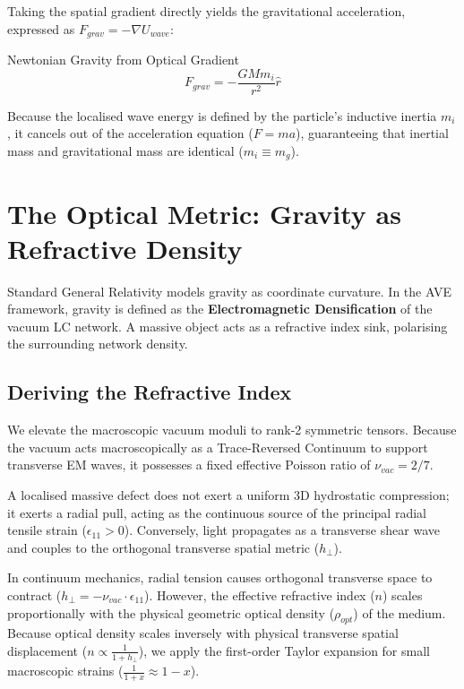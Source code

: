 Taking the spatial gradient directly yields the gravitational acceleration, expressed as $F_{grav}=-\nabla U_{wave}$:

\begin{resultbox}{Newtonian Gravity from Optical Gradient}
\begin{equation}
F_{grav}=-\frac{GM m_i}{r^{2}}\hat{r}
\end{equation}
\end{resultbox}

Because the localised wave energy is defined by the particle's inductive inertia $m_i$, it cancels out of the acceleration equation ($F=ma$), guaranteeing that inertial mass and gravitational mass are identical ($m_i\equiv m_g$).

\section{The Optical Metric: Gravity as Refractive Density}
\label{sec:optical_metric}

Standard General Relativity models gravity as coordinate curvature. In the AVE framework, gravity is defined as the \textbf{Electromagnetic Densification} of the vacuum LC network. A massive object acts as a refractive index sink, polarising the surrounding network density.

\subsection{Deriving the Refractive Index}

We elevate the macroscopic vacuum moduli to rank-2 symmetric tensors. Because the vacuum acts macroscopically as a Trace-Reversed Continuum to support transverse EM waves, it possesses a fixed effective Poisson ratio of $\nu_{vac}=2/7$. 

A localised massive defect does not exert a uniform 3D hydrostatic compression; it exerts a radial pull, acting as the continuous source of the principal radial tensile strain ($\epsilon_{11} > 0$). Conversely, light propagates as a transverse shear wave and couples to the orthogonal transverse spatial metric ($h_{\perp}$). 

In continuum mechanics, radial tension causes orthogonal transverse space to contract ($h_{\perp} = -\nu_{vac} \cdot \epsilon_{11}$). However, the effective refractive index ($n$) scales proportionally with the physical geometric optical density ($\rho_{opt}$) of the medium. Because optical density scales inversely with physical transverse spatial displacement ($n \propto \frac{1}{1 + h_{\perp}}$), we apply the first-order Taylor expansion for small macroscopic strains ($\frac{1}{1+x} \approx 1-x$). 


